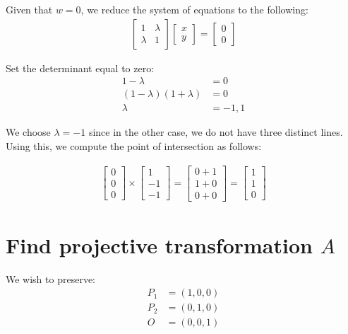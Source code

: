 \documentclass[12pt, oneside]{article}
\begin{document}
Given that $w = 0$, we reduce the system of equations to the following:      
\begin{align*}
\begin{bmatrix}
1 		& \lambda 		\\
\lambda & 1 		
\end{bmatrix} 
\begin{bmatrix}
x\\
y
\end{bmatrix} = 
\begin{bmatrix}
0\\
0
\end{bmatrix}
\end{align*}

Set the determinant equal to zero:
\begin{align*}
1-\lambda &= 0 \\
(1-\lambda)(1 + \lambda ) &= 0 \\
\lambda &= -1, 1
\end{align*}

We choose $\lambda = -1$ since in the other case, we do not have three distinct lines. Using this, we compute the point of intersection as follows:

\begin{align*}
\begin{bmatrix}
0 \\
0 \\ 
0
\end{bmatrix} \times
\begin{bmatrix}
1 \\
-1 \\ 
-1
\end{bmatrix} = 
\begin{bmatrix}
0 +1\\
1+0\\ 
0+0
\end{bmatrix} =
\begin{bmatrix}
1\\
1\\ 
0
\end{bmatrix} 
\end{align*}

\section{Find projective transformation $A$}  

We wish to preserve:
\begin{align*}
P_1 &= (1, 0, 0)\\
P_2 &= (0, 1, 0)\\
O &= (0, 0, 1)
\end{align*}
\end{document}
